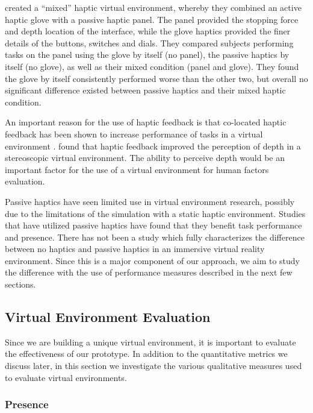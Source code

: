 \citet{borst_evaluation_2005} created a ``mixed'' haptic virtual environment, whereby they combined an active haptic glove with a passive haptic panel.
The panel provided the stopping force and depth location of the interface, while the glove haptics provided the finer details of the buttons, switches and dials.
They compared subjects performing tasks on the panel using the glove by itself (no panel), the passive haptics by itself (no glove), as well as their mixed condition (panel and glove).
They found the glove by itself consistently performed worse than the other two, but overall no significant difference existed between passive haptics and their mixed haptic condition.

An important reason for the use of haptic feedback is that co-located haptic feedback has been shown to increase performance of tasks in a virtual environment \citep{swapp_interaction_2006}.
\citet{bouguila_effect_2000} found that haptic feedback improved the perception of depth in a stereoscopic virtual environment.
The ability to perceive depth would be an important factor for the use of a virtual environment for human factors evaluation.

Passive haptics have seen limited use in virtual environment research, possibly due to the limitations of the simulation with a static haptic environment.
Studies that have utilized passive haptics have found that they benefit task performance and presence.
There has not been a study which fully characterizes the difference between no haptics and passive haptics in an immersive virtual reality environment.
Since this is a major component of our approach, we aim to study the difference with the use of performance measures described in the next few sections.

\subsection{Virtual Environment Evaluation}
\label{virtual-environment-evaluation}

Since we are building a unique virtual environment, it is important to evaluate the effectiveness of our prototype.
In addition to the quantitative metrics we discuss later, in this section we investigate the various qualitative measures used to evaluate virtual environments.

\subsubsection{Presence}


